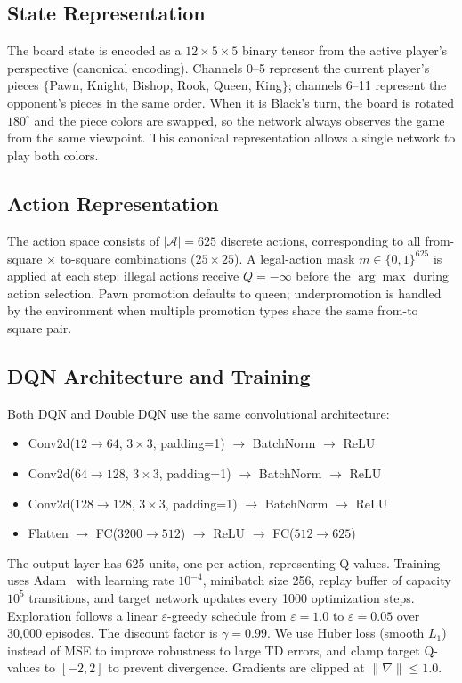 \documentclass[letterpaper]{article}
\begin{document}
\subsection{State Representation}

The board state is encoded as a $12 \times 5 \times 5$ binary tensor from the active player's perspective (canonical encoding).
Channels 0--5 represent the current player's pieces $\{$Pawn, Knight, Bishop, Rook, Queen, King$\}$; channels 6--11 represent the opponent's pieces in the same order.
When it is Black's turn, the board is rotated $180^\circ$ and the piece colors are swapped, so the network always observes the game from the same viewpoint.
This canonical representation allows a single network to play both colors.

\subsection{Action Representation}

The action space consists of $|\mathcal{A}| = 625$ discrete actions, corresponding to all from-square $\times$ to-square combinations ($25 \times 25$).
A legal-action mask $m \in \{0, 1\}^{625}$ is applied at each step: illegal actions receive $Q = -\infty$ before the $\arg\max$ during action selection.
Pawn promotion defaults to queen; underpromotion is handled by the environment when multiple promotion types share the same from-to square pair.

\subsection{DQN Architecture and Training}

Both DQN and Double DQN use the same convolutional architecture:
\begin{itemize}
    \item Conv2d($12 \to 64$, $3 \times 3$, padding=1) $\to$ BatchNorm $\to$ ReLU
    \item Conv2d($64 \to 128$, $3 \times 3$, padding=1) $\to$ BatchNorm $\to$ ReLU
    \item Conv2d($128 \to 128$, $3 \times 3$, padding=1) $\to$ BatchNorm $\to$ ReLU
    \item Flatten $\to$ FC($3200 \to 512$) $\to$ ReLU $\to$ FC($512 \to 625$)
\end{itemize}
The output layer has 625 units, one per action, representing Q-values.
Training uses Adam~\cite{kingma2014adam} with learning rate $10^{-4}$, minibatch size 256, replay buffer of capacity $10^5$ transitions, and target network updates every 1000 optimization steps.
Exploration follows a linear $\varepsilon$-greedy schedule from $\varepsilon = 1.0$ to $\varepsilon = 0.05$ over 30,000 episodes.
The discount factor is $\gamma = 0.99$.
We use Huber loss (smooth $L_1$) instead of MSE to improve robustness to large TD errors, and clamp target Q-values to $[-2, 2]$ to prevent divergence.
Gradients are clipped at $\|\nabla\| \leq 1.0$.
\end{document}
